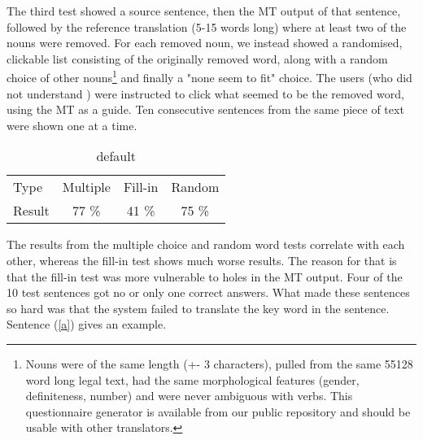 The third test showed a \sme{} source sentence, then the MT output of
that sentence, followed by the reference translation (5-15 words long)
where at least two of the nouns were removed. For each removed noun,
we instead showed a randomised, clickable list consisting of the
originally removed word, along with a random choice of other
nouns\footnote{Nouns were of the same length (+- 3 characters), pulled
  from the same 55128 word long legal text, had the same morphological
  features (gender, definiteness, number) and were never ambiguous
  with verbs. This questionnaire generator is available from our
  public repository and should be usable with other translators.} and
finally a "none seem to fit" choice. The users (who did not understand
\sme{}) were instructed to click what seemed to be the removed word,
using the MT as a guide. Ten consecutive sentences from the same piece
of text were shown one at a time.

\begin{table}[htdp]
\caption{default}
\begin{center}
\begin{tabular}{lccc}
Type & Multiple & Fill-in & Random \\
Result & 77 \% & 41 \% & 75 \% \\
\end{tabular}
\end{center}
\label{eval}
\end{table}%



The results from the multiple choice and random word tests correlate with each other, whereas the fill-in test shows much worse results. The reason for that is that the fill-in test was more vulnerable to holes in the MT output. Four of the 10 test sentences got no or only one correct answers. What made these sentences so hard was that the system failed to translate the key word in the sentence. Sentence (\ref{a}) gives an example.



